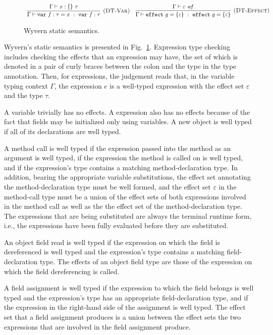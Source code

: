 \begin{figure}[tb]
{\[\begin{array}{c}
\infer[\textsc{(DT-Var)}]
  {\Gamma \vdash \keyw{var} f : \tau = x~:~\keyw{var} f : \tau}
  {\Gamma \vdash x : \{ \}~\tau} \quad 

\infer[\textsc{(DT-Effect)}]
  {\Gamma \vdash \keyw{effect} g = \{ \varepsilon \}~:~\keyw{effect} g = \{ \varepsilon \}}
  {\Gamma \vdash \varepsilon~\mathit{wf}}
\end{array}
\]
}
\caption{Wyvern static semantics.}
\label{f-effects-static-semantics}
\end{figure}

Wyvern's static semantics is presented in Fig.~\ref{f-effects-static-semantics}. Expression type checking includes checking the effects that an expression may have, the set of which is denoted in a pair of curly braces between the colon and the type in the type annotation. Then, for expressions, the judgement reads that, in the variable typing context $\Gamma$, the expression $e$ is a well-typed expression with the effect set $\varepsilon$ and the type $\tau$.

A variable trivially has no effects. A  expression also has no effects because of the fact that fields may be initialized only using variables. A new object is well typed if all of its declarations are well typed.

A method call is well typed if the expression passed into the method as an argument is well typed, if the expression the method is called on is well typed, and if the expression's type contains a matching method-declaration type. In addition, bearing the appropriate variable substitutions, the effect set annotating the method-declaration type must be well formed, and the effect set $\varepsilon$ in the method-call type must be a union of the effect sets of both expressions involved in the method call as well as the the effect set of the method-declaration type. The expressions that are being substituted are always the terminal runtime form, i.e., the expressions have been fully evaluated before they are substituted.

An object field read is well typed if the expression on which the field is dereferenced is well typed and the expression's type contains a matching field-declaration type. The effects of an object field type are those of the expression on which the field dereferencing is called.

A field assignment is well typed if the expression to which the field belongs is well typed and the expression's type has an appropriate field-declaration type, and if the expression in the right-hand side of the assignment is well typed. The effect set that a field assignment produces is a union between the effect sets the two expressions that are involved in the field assignment produce.

